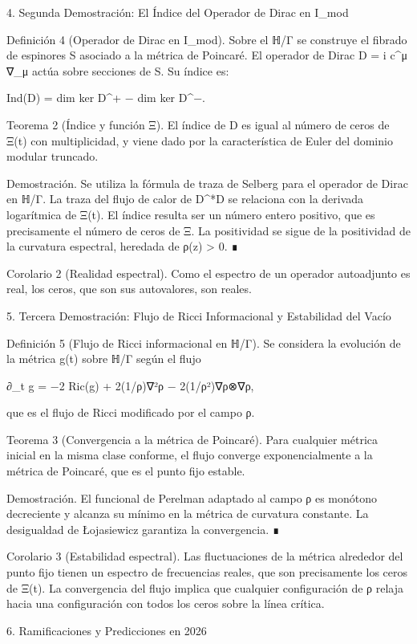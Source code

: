 \documentclass[12pt,a4paper]{book}
\begin{document}
4. Segunda Demostración: El Índice del Operador de Dirac en I_{mod}

Definición 4 (Operador de Dirac en I_{mod}). Sobre el ℍ/Γ se construye el fibrado de espinores S asociado a la métrica de Poincaré. El operador de Dirac D = i c^μ ∇_μ actúa sobre secciones de S. Su índice es:

Ind(D) = dim ker D^+ − dim ker D^−.

Teorema 2 (Índice y función Ξ). El índice de D es igual al número de ceros de Ξ(t) con multiplicidad, y viene dado por la característica de Euler del dominio modular truncado.

Demostración. Se utiliza la fórmula de traza de Selberg para el operador de Dirac en ℍ/Γ. La traza del flujo de calor de D^*D se relaciona con la derivada logarítmica de Ξ(t). El índice resulta ser un número entero positivo, que es precisamente el número de ceros de Ξ. La positividad se sigue de la positividad de la curvatura espectral, heredada de ρ(z) > 0. ∎

Corolario 2 (Realidad espectral). Como el espectro de un operador autoadjunto es real, los ceros, que son sus autovalores, son reales.

5. Tercera Demostración: Flujo de Ricci Informacional y Estabilidad del Vacío

Definición 5 (Flujo de Ricci informacional en ℍ/Γ). Se considera la evolución de la métrica g(t) sobre ℍ/Γ según el flujo

∂_t g = −2 Ric(g) + 2(1/ρ)∇²ρ − 2(1/ρ²)∇ρ⊗∇ρ,

que es el flujo de Ricci modificado por el campo ρ.

Teorema 3 (Convergencia a la métrica de Poincaré). Para cualquier métrica inicial en la misma clase conforme, el flujo converge exponencialmente a la métrica de Poincaré, que es el punto fijo estable.

Demostración. El funcional de Perelman adaptado al campo ρ es monótono decreciente y alcanza su mínimo en la métrica de curvatura constante. La desigualdad de Łojasiewicz garantiza la convergencia. ∎

Corolario 3 (Estabilidad espectral). Las fluctuaciones de la métrica alrededor del punto fijo tienen un espectro de frecuencias reales, que son precisamente los ceros de Ξ(t). La convergencia del flujo implica que cualquier configuración de ρ relaja hacia una configuración con todos los ceros sobre la línea crítica.

6. Ramificaciones y Predicciones en 2026
\end{document}

